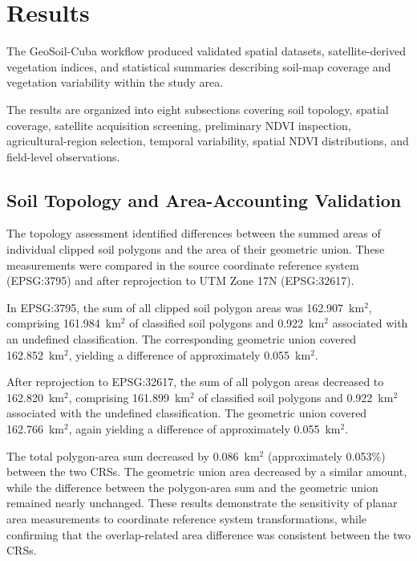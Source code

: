 \section{Results}
\label{sec:results}

The GeoSoil-Cuba workflow produced validated spatial
datasets, satellite-derived vegetation indices, and
statistical summaries describing soil-map coverage
and vegetation variability within the study area.

The results are organized into eight subsections
covering soil topology, spatial coverage, satellite
acquisition screening, preliminary NDVI inspection,
agricultural-region selection, temporal variability,
spatial NDVI distributions, and field-level observations.


\subsection{Soil Topology and Area-Accounting Validation}
\label{subsec:topology_validation}

The topology assessment identified differences between
the summed areas of individual clipped soil polygons
and the area of their geometric union. These
measurements were compared in the source coordinate
reference system (EPSG:3795) and after reprojection
to UTM Zone 17N (EPSG:32617).

In EPSG:3795, the sum of all clipped soil polygon
areas was 162.907~km$^2$, comprising
161.984~km$^2$ of classified soil polygons and
0.922~km$^2$ associated with an undefined
classification. The corresponding geometric union
covered 162.852~km$^2$, yielding a difference
of approximately 0.055~km$^2$.

After reprojection to EPSG:32617, the sum of all
polygon areas decreased to 162.820~km$^2$,
comprising 161.899~km$^2$ of classified soil
polygons and 0.922~km$^2$ associated with the
undefined classification. The geometric union
covered 162.766~km$^2$, again yielding a
difference of approximately 0.055~km$^2$.

The total polygon-area sum decreased by
0.086~km$^2$ (approximately 0.053\%)
between the two CRSs. The geometric union
area decreased by a similar amount, while
the difference between the polygon-area sum
and the geometric union remained nearly
unchanged. These results demonstrate the
sensitivity of planar area measurements to
coordinate reference system transformations,
while confirming that the overlap-related
area difference was consistent between
the two CRSs.

